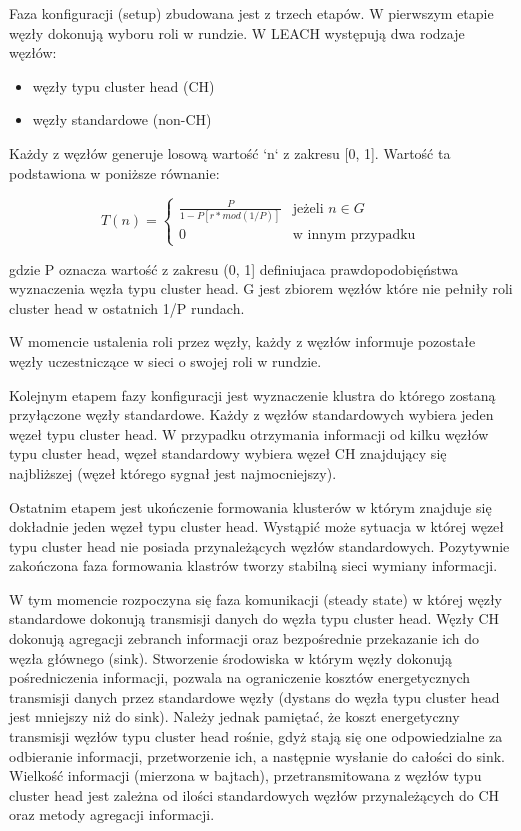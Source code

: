 \documentclass[a4paper,12pt,twoside,openany]{report}
\begin{document}
Faza konfiguracji (setup) zbudowana jest z trzech etapów.
W pierwszym etapie węzły dokonują wyboru roli w rundzie. W LEACH występują dwa rodzaje węzłów:

\begin{itemize}
 \item węzły typu cluster head (CH)
 \item węzły standardowe (non-CH)
\end{itemize}

Każdy z węzłów generuje losową wartość `n` z zakresu [0, 1]. Wartość ta podstawiona w poniższe równanie:

\[
T(n) = \begin{cases}
\frac{P}{1 - P[r * mod(1/P)]} & \text{jeżeli } n \in G\\
0 & \text{w innym przypadku}
\end{cases}
\]

gdzie P oznacza wartość z zakresu (0, 1] definiujaca prawdopodobięństwa wyznaczenia węzła typu cluster head.
G jest zbiorem węzłów które nie pełniły roli cluster head w ostatnich 1/P rundach.

W momencie ustalenia roli przez węzły, każdy z węzłów informuje pozostałe węzły uczestniczące w sieci o swojej roli w rundzie.

Kolejnym etapem fazy konfiguracji jest wyznaczenie klustra do którego zostaną przyłączone węzły standardowe.
Każdy z węzłów standardowych wybiera jeden węzeł typu cluster head. W przypadku otrzymania informacji od kilku węzłów typu cluster head,
węzeł standardowy wybiera węzeł CH znajdujący się najbliższej (węzeł którego sygnał jest najmocniejszy).

Ostatnim etapem jest ukończenie formowania klusterów w którym znajduje się dokładnie jeden węzeł typu cluster head.
Wystąpić może sytuacja w której węzeł typu cluster head nie posiada przynależących węzłów standardowych.
Pozytywnie zakończona faza formowania klastrów tworzy stabilną sieci wymiany informacji.

W tym momencie rozpoczyna się faza komunikacji (steady state) w której węzły standardowe dokonują transmisji danych do  węzła typu cluster head.
Węzły CH dokonują agregacji zebranch informacji oraz bezpośrednie przekazanie ich do węzła głównego (sink).
Stworzenie środowiska w którym węzły dokonują pośredniczenia informacji, pozwala na ograniczenie kosztów energetycznych transmisji danych przez
standardowe węzły (dystans do węzła typu cluster head jest mniejszy niż do sink). Należy jednak pamiętać, że koszt energetyczny transmisji węzłów typu cluster head rośnie, gdyż
stają się one odpowiedzialne za odbieranie informacji, przetworzenie ich, a następnie wysłanie do całości do sink. Wielkość informacji (mierzona w bajtach), przetransmitowana 
z węzłów typu cluster head jest zależna od ilości standardowych węzłów przynależących do CH oraz metody agregacji informacji.
\end{document}
